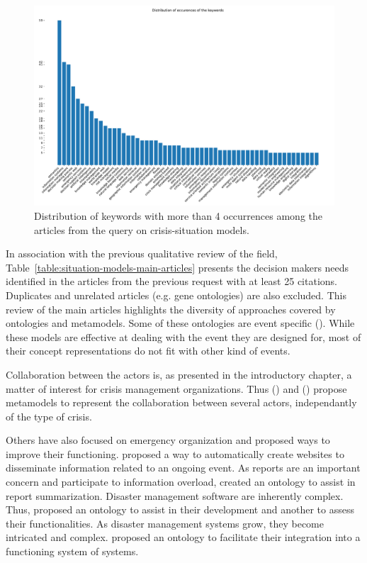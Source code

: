\begin{figure}[htb]
    \includegraphics[width=\textwidth]{figures/chap-2/situation-models-bar.pdf}
    \caption{Distribution of keywords with more than 4 occurrences among the articles from the query on crisis-situation models.}
    \label{literature:situation-models-bar}
\end{figure}

In association with the previous qualitative review of the field, Table~\ref{table:situation-models-main-articles} presents the decision makers needs identified in the articles from the previous request with at least 25 citations.
Duplicates and unrelated articles (e.g. gene ontologies) are also excluded.
This review of the main articles highlights the diversity of approaches covered by ontologies and metamodels.
Some of these ontologies are event specific (\cite{xuModelingRepresentationEarthquake2014,qiuIntegratedFloodManagement2017,jungOntologydrivenSlopeModeling2015}).
While these models are effective at dealing with the event they are designed for, most of their concept representations do not fit with other kind of events.

Collaboration between the actors is, as presented in the introductory chapter, a matter of interest for crisis management organizations.
Thus (\cite{benabenMetamodelItsOntology2008b}) and (\cite{othmanDevelopmentValidationDisaster2014b}) propose metamodels to represent the collaboration between several actors, independantly of the type of crisis.

Others have also focused on emergency organization and proposed ways to improve their functioning.
\cite{chouOntologyDevelopingWeb2011} proposed a way to automatically create websites to disseminate information related to an ongoing event.
As reports are an important concern and participate to information overload, \cite{liOntologyenrichedMultiDocumentSummarization2010} created an ontology to assist in report summarization.
Disaster management software are inherently complex. Thus, \cite{babitskiSoKNOSUsingSemantic2011} proposed an ontology to assist in their development and another to assess their functionalities.
As disaster management systems grow, they become intricated and complex. \cite{madniSystemsIntegrationKey2014} proposed an ontology to facilitate their integration into a functioning system of systems.

